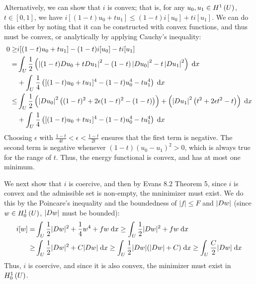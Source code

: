 Alternatively, we can show that $i$ is convex; that is, for any $u_0, u_1 \in H^{1}\left(U \right)$,
$t \in [0, 1]$, we have $i[(1 - t) u_0 + t u_1] \leq (1 - t) i[u_0] + t i[u_1]$.
We can do this either by noting that it can be constructed with convex functions,
and thus must be convex, or analytically by applying Cauchy's inequality:
\begin{align*}
 0 \geq &i[(1 - t) u_0 + t u_1] - (1 - t) i[u_0] - t i[u_1]\\
   = &\int_{U} \frac{1}{2} \left(
         \left\lvert (1 - t) D u_0 + t D u_1 \right \rvert^2
           - (1 - t) \left\lvert D u_0 \right\rvert^2
           - t \left\lvert D u_1 \right\rvert^2 \right) \;\mathrm{d}x\\
     &+ \int_{U} \frac{1}{4} \left(
         [(1 - t) u_0 + t u_1]^4
         - (1 - t) u_0^4 - t u_1^4 \right) \;\mathrm{d}x\\
   \leq &\int_{U} \frac{1}{2}
           \left(\left\lvert D u_0 \right\rvert^2 \left( (1 - t)^2 + 2 \epsilon (1 - t)^2 - (1 - t) \right) \right)
           + \left(\left\lvert D u_1 \right\rvert^2 \left( t^2 + 2 \epsilon t^2 - t \right) \right) \;\mathrm{d}x\\
        &+ \int_{U} \frac{1}{4} \left(
          [(1 - t) u_0 + t u_1]^4 - (1 - t) u_0^4 - t u_1^4 \right) \;\mathrm{d}x\\
\end{align*}
Choosing $\epsilon$ with $\frac{1 - t}{4 t} < \epsilon < \frac{1 - t}{2 t}$
ensures that the first term is negative.
The second term is negative whenever $(1 - t) (u_0 - u_1)^2 > 0$, which is always true for the range of $t$.
Thus, the energy functional is convex, and has at most one minimum.

We next show that $i$ is coercive,
and then by Evans 8.2 Theorem 5, since $i$ is convex and the
admissible set is non-empty, the mninimizer must exist.
We do this by the Poincare's inequality and the boundedness of
$\lvert f \rvert \leq F$ and $\lvert D w \rvert$
(since $w \in H_0^{1}\left(U \right)$, $\lvert D w \rvert$ must be bounded):
\begin{align*}
  i[w] =& \int_{U} \frac{1}{2} \lvert D w \rvert^2 + \frac{1}{4} w^4 + f w \;\mathrm{d}x
    \geq \int_{U} \frac{1}{2} \lvert D w \rvert^2 + f w \;\mathrm{d}x\\
    \geq& \int_{U} \frac{1}{2} \lvert D w \rvert^2 + C \lvert D w \rvert \;\mathrm{d}x
    \geq \int_{U} \frac{1}{2} \lvert D w \rvert (\lvert D w \rvert + C) \;\mathrm{d}x
    \geq \int_{U} \frac{C}{2} \lvert D w \rvert \;\mathrm{d}x
\end{align*}
Thus, $i$ is coercive, and since it is also convex, the minimizer must exist in $H_0^{1}\left(U \right)$.
